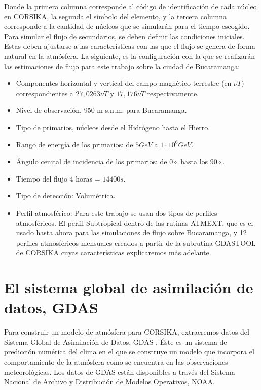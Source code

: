 \newpage

Donde la primera columna corresponde al código de identificación de cada núcleo en CORSIKA, la segunda el símbolo del elemento, y la tercera columna corresponde a la cantidad de núcleos que se simularán para el tiempo escogido. \\

Para simular el flujo de secundarios, se deben definir las condiciones iniciales. Estas deben ajustarse a las características con las que el flujo se genera de forma natural en la atmósfera. La siguiente, es la configuración con la que se realizarán las estimaciones de flujo  para este trabajo sobre la ciudad de Bucaramanga:\\


\begin{itemize}
    \item Componentes horizontal y vertical del campo magnético terrestre (en $\nu T$) correspondientes a $ 27,0263 \nu T$ y $17,176 \nu T$ respectivamente.
    \item Nivel de observación, 950 m s.n.m. para Bucaramanga.
    \item Tipo de primarios, núcleos desde el Hidrógeno hasta el Hierro.
    \item Rango de energía de los primarios: de $5GeV$ a $1\cdot 10^{6} GeV$.
    \item Ángulo cenital de incidencia de los primarios: de $0\circ$ hasta los $90\circ$.
    \item Tiempo del flujo 4 horas = $14400 s$.
    \item Tipo de detección: Volumétrica.
    \item Perfil atmosférico: Para este trabajo se usan dos tipos de perfiles atmosféricos. El perfil Subtropical dentro de las rutinas ATMEXT, que es el usado hasta ahora para las simulaciones de flujo sobre Bucaramanga, y 12 perfiles atmosféricos mensuales creados a partir de la subrutina GDASTOOL de CORSIKA cuyas características explicaremos más adelante.
\end{itemize}{}

\section{El sistema global de asimilación de datos, GDAS}

Para construir un modelo de atmósfera para CORSIKA, extraeremos datos del Sistema Global de Asimilación de Datos, GDAS \citep{GDAS_data}. Éste es un sistema de predicción numérica del clima en el que se construye un modelo que incorpora el comportamiento de la atmósfera como se encuentra en las observaciones meteorológicas. Los datos de GDAS están disponibles a través del Sistema Nacional de Archivo y Distribución de Modelos Operativos, NOAA. \\

